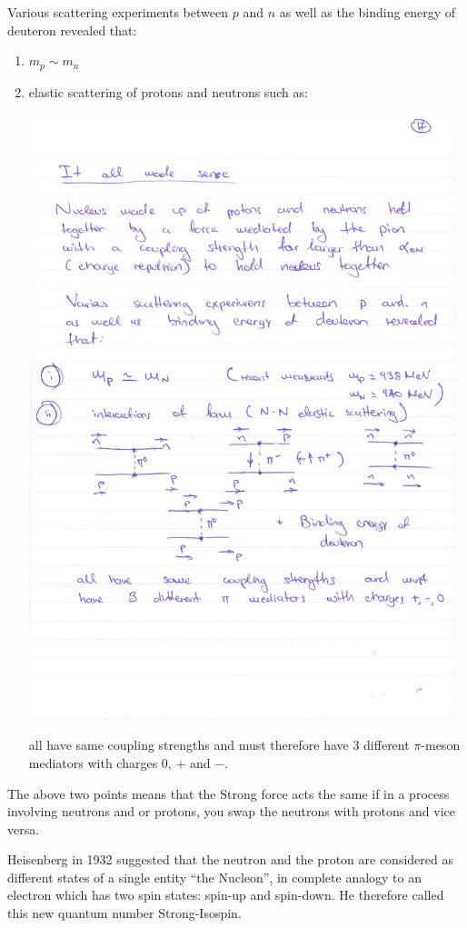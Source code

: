 Various scattering experiments between $p$ and $n$ as well as the binding energy of deuteron revealed that:
\begin{enumerate}
\item $m_p\sim m_n$
\item elastic scattering of protons and neutrons such as: 
\begin{center}
\includegraphics[width=0.98\textwidth]{fig/strongforce/proton_neutron_scattering.pdf}
\end{center}
all have same coupling strengths and must therefore have 3 different $\pi$-meson mediators with charges $0$, $+$ and $-$.
\end{enumerate}
The above two points means that the Strong force acts the same if in a process involving neutrons and or protons, you swap the neutrons with protons and vice versa.

Heisenberg in 1932 suggested that the neutron and the proton are considered as different states of a single entity ``the Nucleon'', in complete analogy to an electron which has two spin states: spin-up and spin-down. He therefore called this new quantum number Strong-Isospin.

